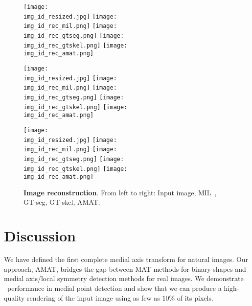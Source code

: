 \documentclass[10pt,twocolumn,letterpaper]{article}
\begin{document}
\begin{figure*}[t]
\centering
\def\imgw{0.195}

\def\img_id{145086}
\texttt{[image: \\img\_id\_resized.jpg]}
\texttt{[image: \\img\_id\_rec\_mil.png]}
\texttt{[image: \\img\_id\_rec\_gtseg.png]}
\texttt{[image: \\img\_id\_rec\_gtskel.png]}
\texttt{[image: \\img\_id\_rec\_amat.png]}

\def\img_id{85048}
\texttt{[image: \\img\_id\_resized.jpg]}
\texttt{[image: \\img\_id\_rec\_mil.png]}
\texttt{[image: \\img\_id\_rec\_gtseg.png]}
\texttt{[image: \\img\_id\_rec\_gtskel.png]}
\texttt{[image: \\img\_id\_rec\_amat.png]}

\def\img_id{42049}
\texttt{[image: \\img\_id\_resized.jpg]}
\texttt{[image: \\img\_id\_rec\_mil.png]}
\texttt{[image: \\img\_id\_rec\_gtseg.png]}
\texttt{[image: \\img\_id\_rec\_gtskel.png]}
\texttt{[image: \\img\_id\_rec\_amat.png]}

\caption{\textbf{Image reconstruction}. From left to right: Input image, MIL~\cite{tsogkas2012learning}, GT-seg, GT-skel, AMAT.}
\label{fig:experiments:reconstruction}
\end{figure*}



\section{Discussion}\label{sec:discussion}
We have defined the first complete medial axis transform for natural images.
Our approach, AMAT, bridges the gap between MAT methods for binary shapes and 
medial axis/local symmetry detection methods for real images.
We demonstrate \sota\ performance in medial point detection and show that we can produce a high-quality 
rendering of the input image using as few as $10\%$ of its pixels. 
\end{document}
